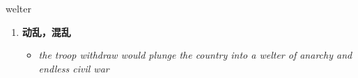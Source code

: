 
\begin{frame}
{\huge welter}
\begin{center}
\begin{enumerate}\Large
  \item \textbf{动乱，混乱}
  \begin{itemize}
    \item \em{\Large{the troop withdraw would plunge the country into a welter of anarchy and endless civil war}}
  \end{itemize}
\end{enumerate}
\end{center}
\end{frame}
